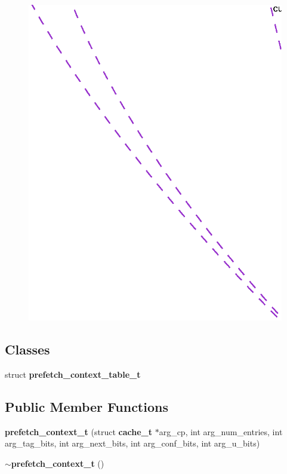 \begin{figure}[H]
\begin{center}
\leavevmode
\includegraphics[width=400pt]{classprefetch__context__t__coll__graph}
\end{center}
\end{figure}
\subsection*{Classes}
\begin{CompactItemize}
\item 
struct {\bf prefetch\_\-context\_\-table\_\-t}
\end{CompactItemize}
\subsection*{Public Member Functions}
\begin{CompactItemize}
\item 
{\bf prefetch\_\-context\_\-t} (struct {\bf cache\_\-t} $\ast$arg\_\-cp, int arg\_\-num\_\-entries, int arg\_\-tag\_\-bits, int arg\_\-next\_\-bits, int arg\_\-conf\_\-bits, int arg\_\-u\_\-bits)
\item 
{\bf $\sim$prefetch\_\-context\_\-t} ()
\end{CompactItemize}
